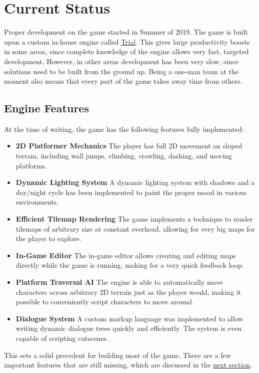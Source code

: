 \section{Current Status}
Proper development on the game started in Summer of 2019. The game is built upon a custom in-house engine called \href{https://shirakumo.org/trial}{Trial}. This gives large productivity boosts in some areas, since complete knowledge of the engine allows very fast, targeted development. However, in other areas development has been very slow, since solutions need to be built from the ground up. Being a one-man team at the moment also means that every part of the game takes away time from others.

\subsection{Engine Features}
At the time of writing, the game has the following features fully implemented:

\begin{itemize}
\item \textbf{2D Platformer Mechanics}\quad
  The player has full 2D movement on sloped terrain, including wall jumps, climbing, crawling, dashing, and moving platforms.
\item \textbf{Dynamic Lighting System}\quad
  A dynamic lighting system with shadows and a day/night cycle has been implemented to paint the proper mood in various environments.
\item \textbf{Efficient Tilemap Rendering}\quad
  The game implements a technique to render tilemaps of arbitrary size at constant overhead, allowing for very big maps for the player to explore.
\item \textbf{In-Game Editor}\quad
  The in-game editor allows creating and editing maps directly while the game is running, making for a very quick feedback loop.
\item \textbf{Platform Traversal AI}\quad
  The engine is able to automatically move characters across arbitrary 2D terrain just as the player would, making it possible to conveniently script characters to move around.
\item \textbf{Dialogue System}\quad
  A custom markup language was implemented to allow writing dynamic dialogue trees quickly and efficiently. The system is even capable of scripting cutscenes.
\end{itemize}

This sets a solid precedent for building most of the game. There are a few important features that are still missing, which are discussed in the \hyperref[sec:future]{next section}.

